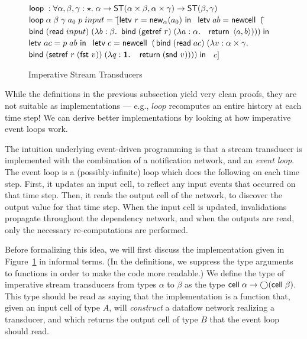 \documentclass[natbib]{sigplanconf}
\begin{document}
\begin{figure}
{\begin{specification}
$\mbox{\textsf{{loop}}}\; : \forall \alpha, \beta, \gamma:\star.\; \alpha \to \mbox{\textsf{{ST}}}({\alpha\times \beta}, {\alpha\times \gamma}) \to \mbox{\textsf{{ST}}}({\beta}, {\gamma})$ \nextline
$\mbox{\textsf{{loop}}}\; \alpha\;\beta\;\gamma\;a_0\; p \; input = $ \nextline
\;\;$[$\=$\mbox{\textsf{{letv }}}r = \mbox{\textsf{{new}}}_{\alpha}(a_0)\mbox{\textsf{{ in }}}$ \nextline
    \>$\mbox{\textsf{{letv}}}\; ab = \mbox{\textsf{{newcell}}}\;\; ($\=$\mbox{\textsf{{bind}}}\; (\mbox{\textsf{{read}}}\; input)\; (\lambda b:\beta.$ \nextline
    \>                                \>$\mbox{\textsf{{bind}}}\; (\mbox{\textsf{{getref}}}\; r)\;       (\lambda a:\alpha.$ \nextline
    \>                                \>$\;\; \mbox{\textsf{{return}}}\; \left<{a},{b}\right>))) \;\mbox{\textsf{{in}}}$ \nextline
    \>$\mbox{\textsf{{letv }}}ac = p\;ab\mbox{\textsf{{ in }}}$ \nextline
    \>$\mbox{\textsf{{letv}}}\;c = \mbox{\textsf{{newcell}}}\;\; ($\=$\mbox{\textsf{{bind}}}\; (\mbox{\textsf{{read}}}\; ac) \;(\lambda v:\alpha \times \gamma.$ \nextline
    \>                              \>$\mbox{\textsf{{bind}}}\; (\mbox{\textsf{{setref}}}\; r\;(\mbox{\textsf{{fst }}} v)) \;(\lambda q:\mathbf{1}.$ \nextline
    \>                              \>$\;\;\mbox{\textsf{{return}}}\; (\mbox{\textsf{{snd }}} v))))\;\mbox{\textsf{{in}}}$ \nextline
    \>$\;\;c]$ 
\end{specification}
}
\caption{Imperative Stream Transducers}
\label{imperative-transducer-semantics}
\end{figure}

While the definitions in the previous subsection yield very clean
proofs, they are not suitable as implementations --- e.g.,
$loop$ recomputes an entire history at each time step! We can derive
better implementations by looking at how imperative event loops work.

The intuition underlying event-driven programming is that a stream
transducer is implemented with the combination of a notification
network, and an \emph{event loop}.  The event loop is a
(possibly-infinite) loop which does the following on each time
step. First, it updates an input cell, to reflect any input events
that occurred on that time step. Then, it reads the output cell of the
network, to discover the output value for that time step. When the
input cell is updated, invalidations propagate throughout the
dependency network, and when the outputs are read, only the
necessary re-computations are performed.

Before formalizing this idea, we will first discuss the implementation
given in Figure~\ref{imperative-transducer-semantics} in informal
terms.  (In the definitions, we suppress the type arguments to
functions in order to make the code more readable.) We define the type
of imperative stream transducers from types $\alpha$ to $\beta$ as the
type $\mbox{\textsf{{cell}}}\;{\alpha} \to \bigcirc{(\mbox{\textsf{{cell}}}\;{\beta})}$.  This type
should be read as saying that the implementation is a function that,
given an input cell of type $A$, will \emph{construct} a dataflow
network realizing a transducer, and which returns the output cell of
type $B$ that the event loop should read.
\end{document}
